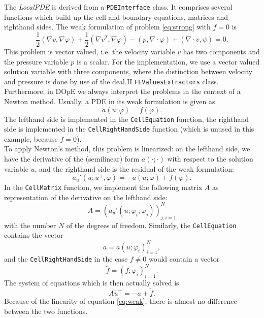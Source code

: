 The \textit{LocalPDE} is derived from a \texttt{PDEInterface} class. It comprises several functions which build up the cell and boundary equations, matrices and righthand sides. The weak formulation of problem \eqref{eq:strong} with $f=0$ is
\begin{equation} \label{eq:weak}
   \frac{1}{2}(\nabla v, \nabla \varphi) + \frac{1}{2}(\nabla v^{T}, \nabla \varphi) - (p, \nabla \cdot \varphi) + (\nabla \cdot v, \psi) = 0.
\end{equation}
This problem is vector valued, i.e. the velocity variable $v$ has two components and the pressure variable $p$ is a scalar. For the implementation, we use a vector valued solution variable with three components, where the distinction between velocity and pressure is done by use of the deal.II \texttt{FEValuesExtractors} class. \\
Furthermore, in DOpE we always interpret the problems in the context of a Newton method. Usually, a PDE in its weak formulation is given as
\begin{equation*}
   a(u;\varphi) = f(\varphi).
\end{equation*}
The lefthand side is implemented in the \texttt{CellEquation} function, the righthand side is implemented in the \texttt{CellRightHandSide} function (which is unused in this example, because $f=0$).\\
To apply Newton's method, this problem is linearized: on the lefthand side, we have the derivative of the (semilinear) form $a(\cdot;\cdot)$ with respect to the solution variable $u$, and the righthand side is the residual of the weak formulation:
\begin{equation*}
   a_u'(u;u^+,\varphi) = -a(u;\varphi) + f(\varphi).
\end{equation*}
In the \texttt{CellMatrix} function, we implement the following matrix $A$ as representation of the derivative on the lefthand side:
\begin{equation*}
  A = (a_u'(u;\varphi_i,\varphi_j))_{j,i=1}^N
\end{equation*}
with the number $N$ of the degrees of freedom. Similarly, the \texttt{CellEquation} contains the vector
\begin{equation*}
  a = a(u;\varphi_i)_{i=1}^{N},
\end{equation*}
and the \texttt{CellRightHandSide} in the case $f \neq 0$ would contain a vector
\begin{equation*}
  \tilde{f} = (f;\varphi_i)_{i=1}^N.
\end{equation*}
The system of equations which is then actually solved is
\begin{equation*}
  A\tilde{u}^+ = -a + \tilde{f}.
\end{equation*}
Because of the linearity of equation \eqref{eq:weak}, there is almost no difference between the two functions.\\

